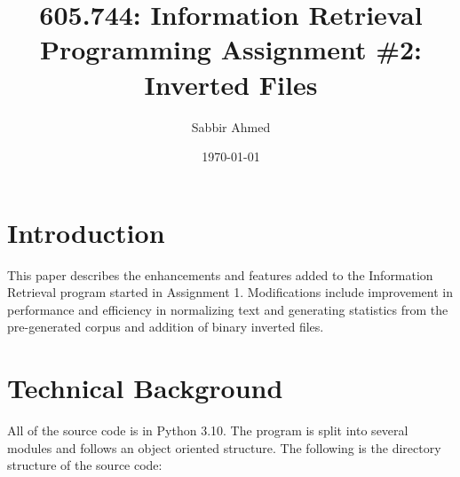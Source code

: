 \documentclass[11pt]{article}
\title{605.744: Information Retrieval \\ Programming Assignment \#2: Inverted Files}
\author{Sabbir Ahmed}
\date{\today}
\begin{document}
\maketitle	

\section{Introduction}
This paper describes the enhancements and features added to the Information Retrieval program started in Assignment 1. Modifications include improvement in performance and efficiency in normalizing text and generating statistics from the pre-generated corpus and addition of binary inverted files.

\section{Technical Background}
All of the source code is in Python 3.10. The program is split into several modules and follows an object oriented structure. The following is the directory structure of the source code:

\end{document}
